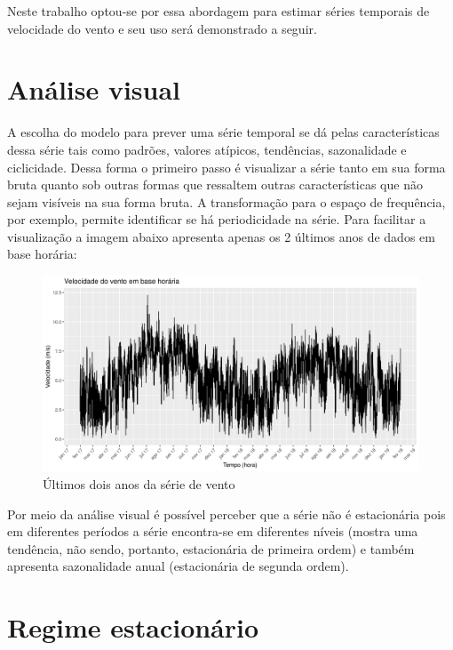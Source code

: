 \documentclass[
	12pt,				%
	openright,			%
	oneside,			%
	a4paper,			%
	english,			%
	french,				%
	spanish,			%
	brazil				%
	]{abntex2}
\begin{document}
Neste trabalho optou-se por essa abordagem para estimar séries temporais de velocidade do vento e seu uso será demonstrado a seguir.

\section{Análise visual}

A escolha do modelo para prever uma série temporal se dá pelas características dessa série tais como padrões, valores atípicos, tendências, sazonalidade e ciclicidade. Dessa forma o primeiro passo é visualizar a série tanto em sua forma bruta quanto sob outras formas que ressaltem outras características que não sejam visíveis na sua forma bruta. A transformação para o espaço de frequência, por exemplo, permite identificar se há periodicidade na série. Para facilitar a visualização a imagem abaixo apresenta apenas os 2 últimos anos de dados em base horária:

\begin{figure}[h]
    \centering
	\includegraphics[width=\textwidth]{entire_series_hourly_basis}
	\caption{Últimos dois anos da série de vento}
\end{figure}
\FloatBarrier

Por meio da análise visual é possível perceber que a série não é estacionária pois em diferentes períodos a série encontra-se em diferentes níveis (mostra uma tendência, não sendo, portanto, estacionária de primeira ordem) e também apresenta sazonalidade anual (estacionária de segunda ordem).

\section{Regime estacionário}
\end{document}

